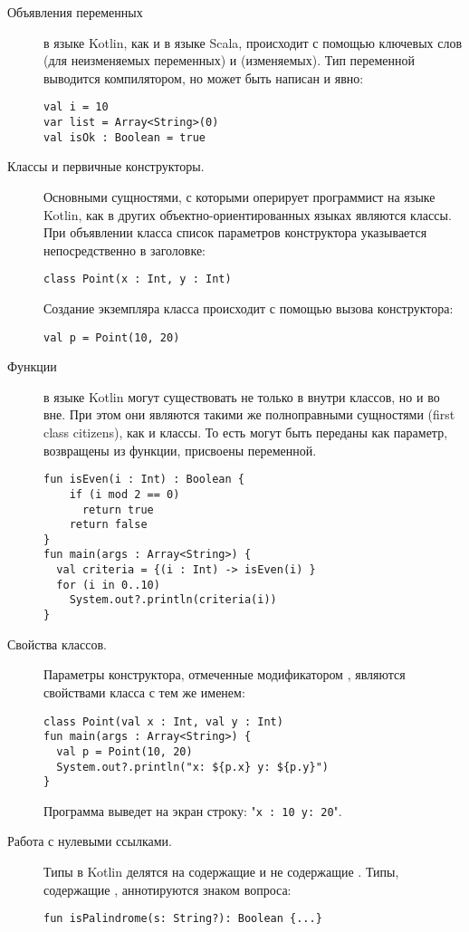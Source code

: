 \begin{description}
\item[Объявления переменных] в языке Kotlin, как и в языке Scala, происходит с помощью ключевых слов  (для неизменяемых переменных) 
и  (изменяемых). Тип переменной выводится компилятором, но может быть написан и явно:
\begin{lstlisting}
val i = 10
var list = Array<String>(0)
val isOk : Boolean = true
\end{lstlisting}
	\item[Классы и первичные конструкторы.] Основными сущностями, с которыми оперирует программист на языке Kotlin, как в других объектно-ориентированных языках являются классы. При объявлении класса список параметров конструктора указывается непосредственно в заголовке:
\begin{lstlisting}
class Point(x : Int, y : Int)
\end{lstlisting}
	Создание экземпляра класса происходит с помощью вызова конструктора:
\begin{lstlisting}
val p = Point(10, 20)
\end{lstlisting}
	\item[Функции] в языке Kotlin могут существовать не только в внутри классов, но и во вне. При этом они являются такими же полноправными сущностями (first class citizens), как и классы. То есть могут быть переданы как параметр, возвращены из функции, присвоены переменной. 
\begin{lstlisting}
fun isEven(i : Int) : Boolean {
    if (i mod 2 == 0)
      return true
    return false
}
fun main(args : Array<String>) {
  val criteria = {(i : Int) -> isEven(i) }
  for (i in 0..10)
    System.out?.println(criteria(i))
}
\end{lstlisting}	
	\item[Свойства классов.] Параметры конструктора, отмеченные модификатором , являются свойствами класса с тем же именем:
\begin{lstlisting}
class Point(val x : Int, val y : Int)
fun main(args : Array<String>) {
  val p = Point(10, 20)
  System.out?.println("x: ${p.x} y: ${p.y}")
}
\end{lstlisting}
	Программа выведет на экран строку: "\texttt{x : 10 y: 20}".
	\item[Работа с нулевыми ссылками.] Типы в Kotlin делятся на содержащие  и не содержащие . Типы, содержащие , аннотируются знаком вопроса:
\begin{lstlisting}
fun isPalindrome(s: String?): Boolean {...}
\end{lstlisting}


\end{description}
